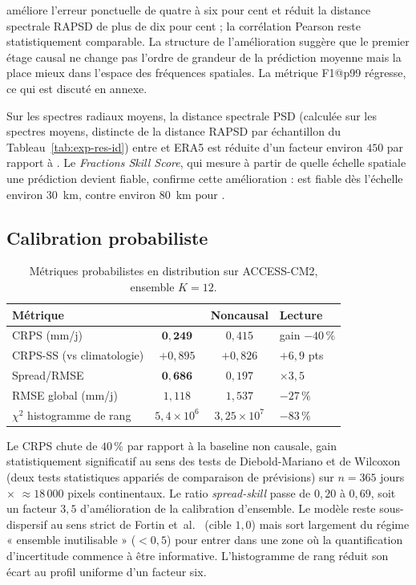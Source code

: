 \Oracle{} améliore l'erreur ponctuelle de quatre à six pour cent et réduit la distance spectrale RAPSD de plus de dix pour cent ; la corrélation Pearson reste statistiquement comparable. La structure de l'amélioration suggère que le premier étage causal ne change pas l'ordre de grandeur de la prédiction moyenne mais la place mieux dans l'espace des fréquences spatiales. La métrique F1@p99 régresse, ce qui est discuté en annexe.

Sur les spectres radiaux moyens, la distance spectrale PSD (calculée sur les spectres moyens, distincte de la distance RAPSD par échantillon du Tableau~\ref{tab:exp-res-id}) entre \Oracle{} et ERA5 est réduite d'un facteur environ $450$ par rapport à \CorrDiff{}. Le \emph{Fractions Skill Score}, qui mesure à partir de quelle échelle spatiale une prédiction devient fiable, confirme cette amélioration : \Oracle{} est fiable dès l'échelle environ $30$~km, contre environ $80$~km pour \CorrDiff{}.

\subsection{Calibration probabiliste}
\label{ssec:exp-res-calib}

\begin{table}[ht]
  \centering
  \small
  \caption[Métriques probabilistes]{Métriques probabilistes en distribution sur ACCESS-CM2, ensemble $K = 12$.}
  \label{tab:exp-res-calib}
  \begin{tabularx}{\linewidth}{l c c X}
    \toprule
    \textbf{Métrique} & \Oracle{} & \textbf{Noncausal} & \textbf{Lecture} \\
    \midrule
    CRPS (mm/j) & $\mathbf{0{,}249}$ & $0{,}415$ & gain $-40\,\%$ \\
    CRPS-SS (vs climatologie) & $+0{,}895$ & $+0{,}826$ & $+6{,}9$ pts \\
    Spread/RMSE & $\mathbf{0{,}686}$ & $0{,}197$ & $\times 3{,}5$ \\
    RMSE global (mm/j) & $1{,}118$ & $1{,}537$ & $-27\,\%$ \\
    $\chi^2$ histogramme de rang & $5{,}4 \times 10^6$ & $3{,}25 \times 10^7$ & $-83\,\%$ \\
    \bottomrule
  \end{tabularx}
\end{table}

Le CRPS chute de $40\,\%$ par rapport à la baseline non causale, gain statistiquement significatif au sens des tests de Diebold-Mariano et de Wilcoxon (deux tests statistiques appariés de comparaison de prévisions) sur $n = 365$ jours $\times$ $\approx 18\,000$ pixels continentaux. Le ratio \emph{spread-skill} passe de $0{,}20$ à $0{,}69$, soit un facteur $3{,}5$ d'amélioration de la calibration d'ensemble. Le modèle reste sous-dispersif au sens strict de Fortin et~al.~\cite{fortin_sk_2014} (cible $1{,}0$) mais sort largement du régime « ensemble inutilisable » ($< 0{,}5$) pour entrer dans une zone où la quantification d'incertitude commence à être informative. L'histogramme de rang réduit son écart au profil uniforme d'un facteur six.

